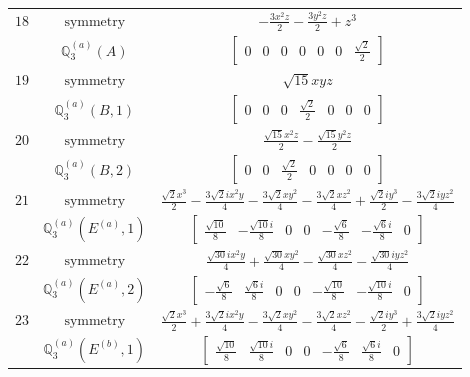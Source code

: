 \documentclass[fleqn,8pt,landscape]{jsarticle}
\begin{document}
\begin{longtable}{ccc}
$ 18 $ & $ \text{symmetry} $ & $ - \frac{3 x^{2} z}{2} - \frac{3 y^{2} z}{2} + z^{3} $ \\
$  $ & $ \mathbb{Q}_{3}^{(a)}(A) $ & $ \begin{bmatrix} 0 & 0 & 0 & 0 & 0 & 0 & \frac{\sqrt{2}}{2} \end{bmatrix} $ \\ \hline
$ 19 $ & $ \text{symmetry} $ & $ \sqrt{15} x y z $ \\
$  $ & $ \mathbb{Q}_{3}^{(a)}(B,1) $ & $ \begin{bmatrix} 0 & 0 & 0 & \frac{\sqrt{2}}{2} & 0 & 0 & 0 \end{bmatrix} $ \\ \hline
$ 20 $ & $ \text{symmetry} $ & $ \frac{\sqrt{15} x^{2} z}{2} - \frac{\sqrt{15} y^{2} z}{2} $ \\
$  $ & $ \mathbb{Q}_{3}^{(a)}(B,2) $ & $ \begin{bmatrix} 0 & 0 & \frac{\sqrt{2}}{2} & 0 & 0 & 0 & 0 \end{bmatrix} $ \\ \hline
$ 21 $ & $ \text{symmetry} $ & $ \frac{\sqrt{2} x^{3}}{2} - \frac{3 \sqrt{2} i x^{2} y}{4} - \frac{3 \sqrt{2} x y^{2}}{4} - \frac{3 \sqrt{2} x z^{2}}{4} + \frac{\sqrt{2} i y^{3}}{2} - \frac{3 \sqrt{2} i y z^{2}}{4} $ \\
$  $ & $ \mathbb{Q}_{3}^{(a)}(E^{(a)},1) $ & $ \begin{bmatrix} \frac{\sqrt{10}}{8} & - \frac{\sqrt{10} i}{8} & 0 & 0 & - \frac{\sqrt{6}}{8} & - \frac{\sqrt{6} i}{8} & 0 \end{bmatrix} $ \\ \hline
$ 22 $ & $ \text{symmetry} $ & $ \frac{\sqrt{30} i x^{2} y}{4} + \frac{\sqrt{30} x y^{2}}{4} - \frac{\sqrt{30} x z^{2}}{4} - \frac{\sqrt{30} i y z^{2}}{4} $ \\
$  $ & $ \mathbb{Q}_{3}^{(a)}(E^{(a)},2) $ & $ \begin{bmatrix} - \frac{\sqrt{6}}{8} & \frac{\sqrt{6} i}{8} & 0 & 0 & - \frac{\sqrt{10}}{8} & - \frac{\sqrt{10} i}{8} & 0 \end{bmatrix} $ \\ \hline
$ 23 $ & $ \text{symmetry} $ & $ \frac{\sqrt{2} x^{3}}{2} + \frac{3 \sqrt{2} i x^{2} y}{4} - \frac{3 \sqrt{2} x y^{2}}{4} - \frac{3 \sqrt{2} x z^{2}}{4} - \frac{\sqrt{2} i y^{3}}{2} + \frac{3 \sqrt{2} i y z^{2}}{4} $ \\
$  $ & $ \mathbb{Q}_{3}^{(a)}(E^{(b)},1) $ & $ \begin{bmatrix} \frac{\sqrt{10}}{8} & \frac{\sqrt{10} i}{8} & 0 & 0 & - \frac{\sqrt{6}}{8} & \frac{\sqrt{6} i}{8} & 0 \end{bmatrix} $ \\ \hline

\end{longtable}
\end{document}
